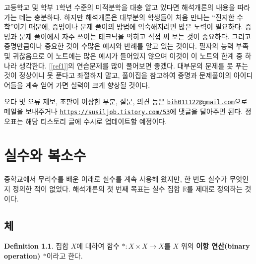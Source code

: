 \documentclass[11pt]{book}
\numberwithin{equation}{chapter}
\def\RR{\mathbb{R}}
\theoremstyle{definition}
\newtheorem{defn}[thm]{Definition}
\begin{document}

고등학교 및 학부 1학년 수준의 미적분학을 대충 알고 있다면 해석개론의 내용을 따라가는 데는 충분하다. 하지만 해석개론은 대부분의 학생들이 처음 만나는 ``진지한 수학''이기 때문에, 증명이나 문제 풀이의 방법에 익숙해지려면 많은 노력이 필요하다. 증명과 문제 풀이에서 자주 쓰이는 테크닉을 익히고 직접 써 보는 것이 중요하다. 그리고 증명만큼이나 중요한 것이 수많은 예시와 반례를 알고 있는 것이다. 필자의 능력 부족 및 귀찮음으로 이 노트에는 많은 예시가 들어있지 않으며 이것이 이 노트의 한계 중 하나라 생각한다. [\ref{ref1}]\과 [\ref{ref2}]의 연습문제를 많이 풀어보면 좋겠다. 대부분의 문제를 못 푸는 것이 정상이니 못 푼다고 좌절하지 말고, 풀이집을 참고하여 증명과 문제풀이의 아이디어들을 계속 얻어 가면 실력이 크게 향상될 것이다.


오타 및 오류 제보, 조판이 이상한 부분, 질문, 의견 등은 \href{mailto:bih011122@gmail.com}{\texttt{bih011122@gmail.com}}으로 메일을 보내주거나 \href{https://susiljob.tistory.com/53}{\texttt{https://susiljob.tistory.com/53}}에 댓글을 달아주면 된다. 정오표는 해당 티스토리 글에 수시로 업데이트할 예정이다.

\tableofcontents

\chapter{실수와 복소수}

중학교에서 무리수를 배운 이래로 실수를 계속 사용해 왔지만, 한 번도 실수가 무엇인지 정의한 적이 없었다. 해석개론의 첫 번째 목표는 실수 집합 $\RR$를 제대로 정의하는 것이다.

\section{체}

    \begin{defn}
        집합 \(X\)에 대하여 함수 \(*: X \times X \to X\)를 \(X\) 위의 \textbf{이항 연산(binary operation) \(*\)}이라고 한다.
    \end{defn}
\end{document}
